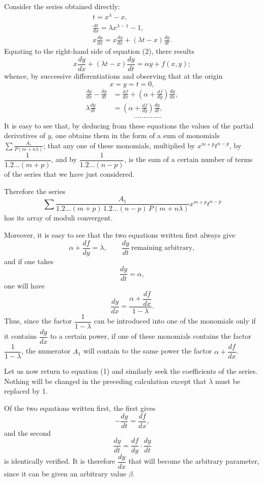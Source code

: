 \documentclass[11pt]{article}
\begin{document}
Consider the series obtained directly:
\[
\begin{gathered}
t=x^\lambda-x,\\
\frac{dt}{dx}=\lambda x^{\lambda-1}-1,\\
x\frac{dy}{dx}=x\frac{dy}{dx}+(\lambda t-x)\frac{dy}{dt}.
\end{gathered}
\]
Equating to the right-hand side of equation (2), there results
\[
x\frac{dy}{dx}+(\lambda t-x)\frac{dy}{dt}=\alpha y+f(x,y);
\]
whence, by successive differentiations and observing that at the origin
\[
x=y=t=0,
\]
\begin{align*}
\frac{dy}{dx}-\frac{dy}{dt}&=\frac{df}{dx}+\left(\alpha+\frac{df}{dy}\right)\frac{dy}{dx},\\
\lambda\frac{dy}{dt}&=\left(\alpha+\frac{df}{dy}\right)\frac{dy}{dt},\\[-0.2em]
&\hspace{3em}\cdots\cdots\cdots\cdots\cdots
\end{align*}
It is easy to see that, by deducing from these equations the values of the partial derivatives of $y$, one obtains them in the form of a sum of monomials $\displaystyle\sum\frac{A_1}{P(m+n\lambda)}$; that any one of these monomials, multiplied by $x^{m+p}t^{n-p}$, by $\dfrac{1}{1.2\ldots(m+p)}$, and by $\dfrac{1}{1.2\ldots(n-p)}$, is the sum of a certain number of terms of the series that we have just considered.

Therefore the series
\[
\sum\frac{A_1}{1.2\ldots(m+p)\,1.2\ldots(n-p)\,P(m+n\lambda)}x^{m+p}t^{n-p}
\]
has its array of moduli convergent.

Moreover, it is easy to see that the two equations written first always give
\[
\alpha+\frac{df}{dy}=\lambda,\qquad \frac{dy}{dt}\ \text{remaining arbitrary},
\]
and if one takes
\[
\frac{dy}{dt}=\alpha,
\]
one will have
\[
\frac{dy}{dx}=\frac{\alpha+\dfrac{df}{dx}}{1-\lambda}.
\]
Thus, since the factor $\dfrac{1}{1-\lambda}$ can be introduced into one of the monomials only if it contains $\dfrac{dy}{dx}$ to a certain power, if one of these monomials contains the factor $\dfrac{1}{1-\lambda}$, the numerator $A_1$ will contain to the same power the factor $\alpha+\dfrac{df}{dx}$.

Let us now return to equation (1) and similarly seek the coefficients of the series. Nothing will be changed in the preceding calculation except that $\lambda$ must be replaced by 1.

Of the two equations written first, the first gives
\[
-\frac{dy}{dt}=\frac{df}{dx},
\]
and the second
\[
\frac{dy}{dt}=\frac{df}{dy}\cdot\frac{dy}{dt}
\]
is identically verified. It is therefore $\dfrac{dy}{dx}$ that will become the arbitrary parameter, since it can be given an arbitrary value $\beta$.
\end{document}
